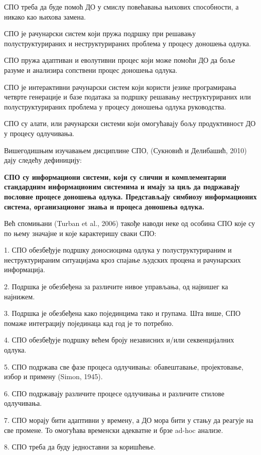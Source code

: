 СПО треба да буде помоћ ДО у смислу повећавања њихових способности, а никако као њихова замена.

СПО је рачунарски систем који пружа подршку при решавању полуструктурираних и неструктурираних проблема у процесу доношења одлука.

СПО пружа адаптиван и еволутивни процес који може помоћи ДО да боље разуме и анализира сопствени процес доношења одлука.

СПО је интерактивни рачунарски систем који користи језике програмирања четврте генерације и базе података за подршку решавању неструктурираних или полуструктурираних проблема у процесу доношења одлука руководства.

СПО су алати, или рачунарски системи који омогућавају бољу продуктивност ДО у процесу одлучивања.

Вишегодишњим изучавањем дисциплине СПО, (Сукновић и Делибашић, 2010) дају следећу дефиницију:

\textbf{СПО су информациони системи, који су слични и комплементарни стандардним информационим системима и имају за циљ да подржавају пословне процесе доношења одлука. Представљају симбиозу информационих система, организационог знања и процеса доношења одлука.}

Већ спомињани (Turban et al., 2006) такође наводи неке од особина СПО које су по њему значајне и које карактеришу сваки СПО:

1. СПО обезбеђује подршку доносиоцима одлука у полуструктурираним и неструктурираним ситуацијама кроз спајање људских процена и рачунарских информација.

2. Подршка је обезбеђена за различите нивое управљања, од највишег ка најнижем.

3. Подршка је обезбеђена како појединцима тако и групама. Шта више, СПО помаже интеграцију појединаца кад год је то потребно.

4. СПО обезбеђује подршку већем броју независних и/или секвенцијалних одлука.

5. СПО подржава све фазе процеса одлучивања: обавештавање, пројектовање, избор и примену (Simon, 1945).

6. СПО подржавају различите процесе одлучивања и различите стилове одлучивања.

7. СПО морају бити адаптивни у времену, а ДО мора бити у стању да реагује на све промене. То омогућава временски адекватне и брзе ad-hoc анализе.

8. СПО треба да буду једноставни за коришћење.

